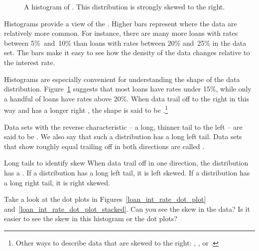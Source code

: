 \begin{figure}[bth]
  \centering
  \caption{A histogram of .
      This distribution is strongly skewed to the right.
      }
  \label{loan50IntRateHist}
\end{figure}

Histograms provide a view of the .
Higher bars represent where the data are relatively more common.
For instance, there are many more loans with rates between
5\%~and~10\% than loans with rates between 20\% and~25\%
in the data set.
The bars make it easy to see how the density of the data
changes relative to the interest rate.

Histograms are especially convenient for understanding the
shape of the data distribution\label{shapeFirstDiscussed}.
Figure~\ref{loan50IntRateHist} suggests that most loans
have rates under 15\%, while only a handful
of loans have rates above 20\%.
When data trail off to the right in this way
and has a longer right ,
the shape is said to be
.\footnote{Other
  ways to describe data that are skewed to the right:
  ,
  ,
  or .}

Data sets with the reverse characteristic --
a long, thinner tail to the left --
are said to be .
We also say that such a distribution has a long left tail.
Data sets that show roughly equal trailing off in both
directions are called .

\begin{onebox}{Long tails to identify skew}
  When data trail off in one direction, the distribution
  has a . 
  If a distribution has a long left tail, it is left skewed.
  If a distribution has a long right tail, it is right skewed.
\end{onebox}

\begin{exercisewrap}
\begin{nexercise}
Take a look at the dot plots in
Figures~\ref{loan_int_rate_dot_plot}
and~\ref{loan_int_rate_dot_plot_stacked}.
Can you see the skew in the data? Is it easier to see the
skew in this histogram or the dot plots?\footnotemark{}
\end{nexercise}
\end{exercisewrap}

